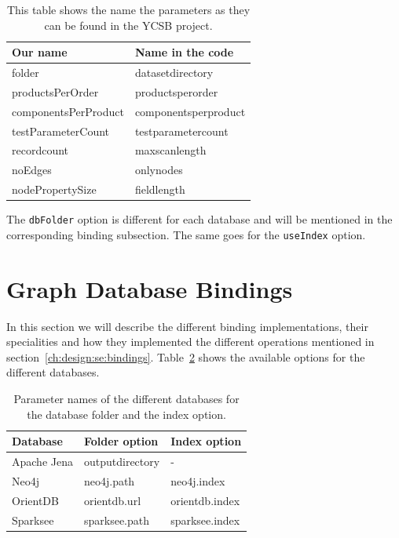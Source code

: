 \begin{table}[h!]
  \begin{minipage}{\textwidth}
    \begin{tabularx}{\textwidth}{ | X | X | }
      \hline
      Our name & Name in the code \\ \hline \hline
      folder & datasetdirectory \\ \hline
      productsPerOrder & productsperorder \\ \hline
      componentsPerProduct & componentsperproduct \\ \hline
      testParameterCount & testparametercount \\ \hline
      recordcount & maxscanlength \\ \hline
      noEdges & onlynodes \\ \hline
      nodePropertySize & fieldlength \\ \hline
    \end{tabularx}
  \end{minipage}
  \caption{This table shows the name the parameters as they can be found in the YCSB project.}
  \label{tab:parameterMapping}
\end{table}

The \texttt{dbFolder} option is different for each database and will be mentioned in the corresponding binding subsection.
The same goes for the \texttt{useIndex} option.

\section{Graph Database Bindings}
\label{ch:implementation:se:graphDatabaseBindings}
In this section we will describe the different binding implementations, their specialities and how they implemented the different operations mentioned in section~\ref{ch:design:se:bindings}.
Table~\ref{tab:bindingParameterMapping} shows the available options for the different databases.

\begin{table}[h!]
  \begin{minipage}{\textwidth}
    \begin{tabularx}{\textwidth}{ | X | X | X | }
      \hline
      Database & Folder option & Index option \\ \hline \hline
      Apache Jena & outputdirectory & - \\ \hline
      Neo4j & neo4j.path & neo4j.index \\ \hline
      OrientDB & orientdb.url & orientdb.index \\ \hline
      Sparksee & sparksee.path & sparksee.index \\ \hline
    \end{tabularx}
  \end{minipage}
  \caption{Parameter names of the different databases for the database folder and the index option.}
  \label{tab:bindingParameterMapping}
\end{table}

